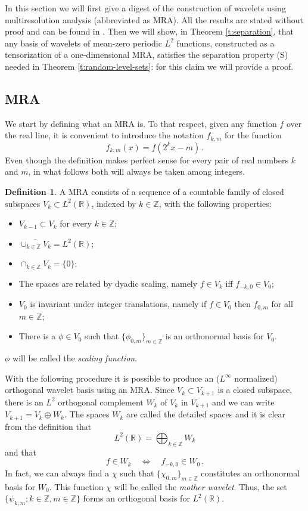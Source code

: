 \documentclass[11pt,reqno]{amsart}
\newcommand{\R}{\mathbb R}
\newcommand{\Z}{{\mathbb Z}}
\theoremstyle{definition}
\newtheorem{definition}[theorem]{Definition}
\numberwithin{equation}{section}
\begin{document}
In this section we will first give a digest of the construction of wavelets using multiresolution analysis (abbreviated as MRA). All the results are stated without proof and can be found in \cite{Dau92}. Then we will show, in Theorem \ref{t:separation}, that any basis of wavelets of mean-zero periodic $L^2$ functions, constructed as a tensorization of a one-dimensional MRA, satisfies the separation property (S) needed in Theorem \ref{t:random-level-sets}: for this claim we will provide a proof.

\subsection{MRA}\label{s:MRA}
We start by defining what an MRA is. To that respect, given any function $f$ over the real line, it is convenient to introduce the notation $f_{k,m}$ for the function
\[
f_{k,m} (x) = f (2^k x-m)\, .
\]
Even though the definition makes perfect sense for every pair of real numbers $k$ and $m$, in what follows both will always be taken among integers. 

\begin{definition}\label{d:MRA}
A MRA consists of a sequence of a countable family of closed subspaces $V_k\subset L^2(\R)$, indexed by $k\in \mathbb Z$, with the following properties:
\begin{itemize}
    \item[(i)] $V_{k-1}\subset V_k$ for every $k\in \mathbb Z$;
    \item[(ii)] $\overline{\cup_{k\in\Z}V_k}=L^2(\R)$;
    \item[(iii)] $\cap_{k\in\Z} V_k=\{0\}$;
    \item[(iv)] The spaces are related by dyadic scaling, namely $f\in V_k$ iff $f_{-k,0} \in V_0$;
    \item[(v)] $V_0$ is invariant under integer translations, namely if $f\in V_0$ then $f_{0,m}$ for all $m\in\Z$;
    \item[(vi)] There is a $\phi\in V_0$ such that $\{\phi_{0,m}\}_{m\in\Z}$ is an orthonormal basis for $V_0$. 
\end{itemize}
$\phi$ will be called the {\em scaling function}.
\end{definition}

With the following procedure it is possible to produce an ($L^\infty$ normalized) orthogonal wavelet basis using an MRA. Since $V_k\subset V_{k+1}$ is a closed subspace, there is an $L^2$ orthogonal complement $W_k$ of $V_k$ in $V_{k+1}$ and we can write $V_{k+1}=V_k\oplus W_k$.
The spaces $W_k$ are called the detailed spaces and it is clear from the definition that 
\[
L^2(\R)=\bigoplus_{k\in\Z}W_k
\]
and that 
\[
f\in W_k \quad \iff \quad f_{-k,0}\in W_0\, . 
\]
In fact, we can always find a $\chi$ such that $\{\chi_{0,m}\}_{m\in\Z}$ constitutes an orthonormal basis for $W_0$. This function $\chi$ will be called the {\em mother wavelet}. Thus, the set $\{\psi_{k,m};k\in\Z,m\in\Z\}$ forms an orthogonal basis for $L^2(\R)$.
\end{document}
